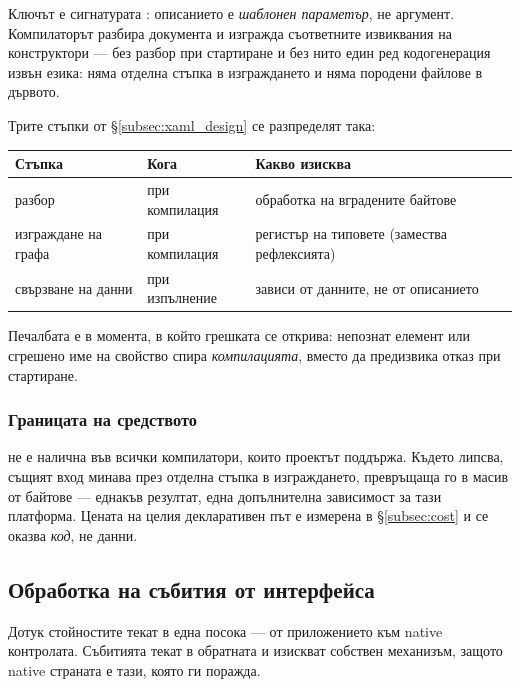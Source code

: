 Ключът е сигнатурата : описанието е
\emph{шаблонен параметър}, не аргумент. Компилаторът разбира документа и изгражда
съответните извиквания на конструктори --- без разбор при стартиране и без нито един ред
кодогенерация извън езика: няма отделна стъпка в изграждането и няма породени файлове в
дървото.

Трите стъпки от §\ref{subsec:xaml_design} се разпределят така:

\begin{center}
\begin{tabular}{@{}L{3.4cm}L{3.0cm}L{7.0cm}@{}}
\hline
\textbf{Стъпка} & \textbf{Кога} & \textbf{Какво изисква} \\
\hline
разбор & при компилация &  обработка на вградените байтове \\
изграждане на графа & при компилация & регистър на типовете (замества рефлексията) \\
свързване на данни & при изпълнение & зависи от данните, не от описанието \\
\hline
\end{tabular}
\end{center}

Печалбата е в момента, в който грешката се открива: непознат елемент или сгрешено име на
свойство спира \emph{компилацията}, вместо да предизвика отказ при стартиране.

\subsubsection{Границата на средството}

 не е налична във всички компилатори, които проектът поддържа. Където
липсва, същият вход минава през отделна стъпка в изграждането, превръщаща го в масив от
байтове --- еднакъв резултат, една допълнителна зависимост за тази платформа. Цената на
целия декларативен път е измерена в §\ref{subsec:cost} и се оказва \emph{код}, не данни.

\subsection{Обработка на събития от интерфейса}
\label{subsec:events_impl}

Дотук стойностите текат в една посока --- от приложението към native контролата. Събитията
текат в обратната и изискват собствен механизъм, защото native страната е тази, която ги
поражда.


